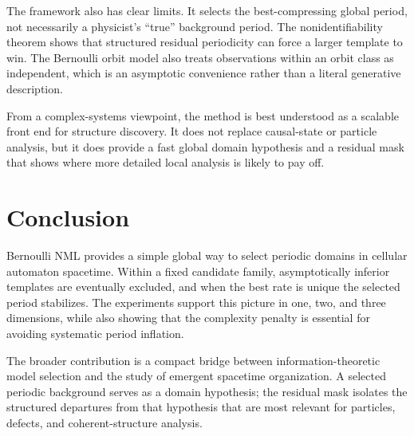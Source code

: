 \documentclass[10pt,twoside]{article}
\begin{document}
The framework also has clear limits. It selects the best-compressing global period, not necessarily a physicist's ``true'' background period. The nonidentifiability theorem shows that structured residual periodicity can force a larger template to win. The Bernoulli orbit model also treats observations within an orbit class as independent, which is an asymptotic convenience rather than a literal generative description.

From a complex-systems viewpoint, the method is best understood as a scalable front end for structure discovery. It does not replace causal-state or particle analysis, but it does provide a fast global domain hypothesis and a residual mask that shows where more detailed local analysis is likely to pay off.

\section{Conclusion}

Bernoulli NML provides a simple global way to select periodic domains in cellular automaton spacetime. Within a fixed candidate family, asymptotically inferior templates are eventually excluded, and when the best rate is unique the selected period stabilizes. The experiments support this picture in one, two, and three dimensions, while also showing that the complexity penalty is essential for avoiding systematic period inflation.

The broader contribution is a compact bridge between information-theoretic model selection and the study of emergent spacetime organization. A selected periodic background serves as a domain hypothesis; the residual mask isolates the structured departures from that hypothesis that are most relevant for particles, defects, and coherent-structure analysis.
\end{document}
